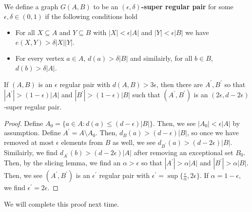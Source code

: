 \begin{definition}
	We define a graph \(G\left( A, B \right) \) to be an \textbf{\(\left( \epsilon, \delta \right) \)-super regular pair} for some \(\epsilon, \delta \in \left( 0, 1 \right) \)  if the following conditions hold
	\begin{itemize}
		\item For all \(X \subseteq A\) and \(Y \subseteq B\) with \(\left| X \right| < \epsilon \left| A \right| \) and \(\left| Y \right| < \epsilon\left| B \right| \) we have \(e\left( X, Y \right) > \delta \left| X \right| \left| Y \right| \).
		\item For every vertex \(a \in A\), \(d\left( a \right) > \delta \left| B \right| \) and similairly, for all \(b \in B\), \(d\left( b \right) > \delta \left| A \right| \).
	\end{itemize}
\end{definition}
\begin{proposition}
	If \(\left( A, B \right) \) is an \(\epsilon\) regular pair with \(d\left( A, B \right) > 3\epsilon\), then there are \(A^{\prime}, B^{\prime}\) so that \(\left| A^{\prime} \right| > \left( 1-\epsilon \right) \left| A \right|  \) and \(\left| B^{\prime} \right|> \left( 1-\epsilon \right) \left| B \right|  \)  such that \(\left( A^{\prime}, B^{\prime} \right) \) is an \(\left( 2\epsilon, d - 2\epsilon \right) \)-super regular pair.
\end{proposition}
\begin{proof}
	Define \(A_0 = \{a \in A :  d\left( a \right) \le \left( d - \epsilon \right) \left| B \right| \} \). Then, we see \(\left| A_0 \right| < \epsilon \left| A \right| \) by assumption. Define \(A^{\prime} = A \setminus A_0\). Then, \(d_{B}\left( a \right) > \left( d -\epsilon \right) \left| B \right| \), so once we have removed at most \(\epsilon\) elements from \(B\) as well, we see \(d_{B^{\prime}}\left( a \right) > \left( d - 2\epsilon \right) \left| B \right| \). Similairly, we find \(d_{A^{\prime}}\left( b  \right) > \left( d - 2\epsilon \right) \left| A \right|  \) after removing an exceptional set \(B_0\).\\
	Then, by the slicing lemma, we find an \(\alpha > \epsilon\) so that \(\left| A^{\prime} \right| > \alpha \left| A \right| \) and \(\left| B^{\prime} \right| > \alpha \left| B \right|  \). Then, we see \(\left( A^{\prime}, B^{\prime} \right) \) is an \(\epsilon^{\prime}\) regular pair with \(\epsilon^{\prime} = \sup \{ \frac{\epsilon}{\alpha}, 2\epsilon \} \). If \(\alpha = 1-\epsilon\), we find \(\epsilon^{\prime} = 2\epsilon\).
\end{proof}
We will complete this proof next time.
